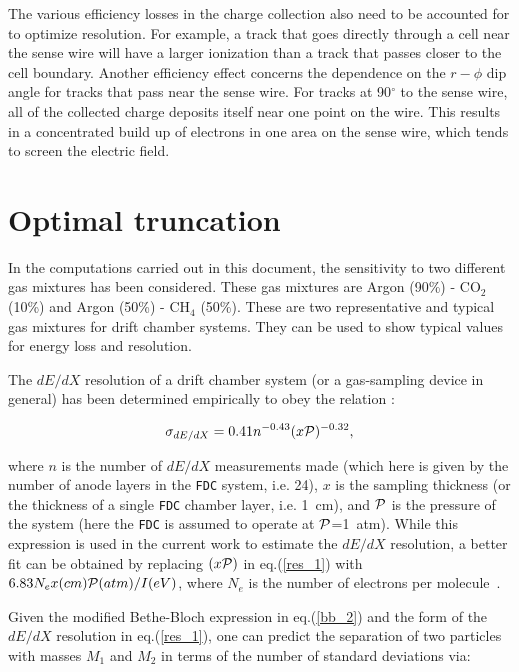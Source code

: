\documentclass[12pt]{article}
\begin{document}
The various efficiency losses in the charge collection also need to be
accounted for to optimize resolution.  For example, a track that goes
directly through a cell near the sense wire will have a larger ionization
than a track that passes closer to the cell boundary.
Another efficiency effect concerns the dependence on the $r - \phi$ dip
angle for tracks that pass near the sense wire.  For tracks at
90$^{\circ}$ to the sense wire, all of the collected charge deposits itself
near one point on the wire.  This results in a concentrated build up of
electrons in one area on the sense wire, which tends to screen the electric
field.

\section{Optimal truncation}
\label{sec:studies}

In the computations carried out in this document, the sensitivity to two different gas mixtures has been considered.  These gas mixtures are Argon (90\%) - CO$_2$ (10\%) 
and Argon (50\%) - CH$_4$ (50\%). These are two representative and typical gas mixtures for drift chamber systems.  They can be used to show typical values for energy loss and resolution.

The $dE/dX$ resolution of a drift chamber system (or a gas-sampling device in general) has been determined empirically to obey the relation \cite{yamamoto,walenta}:

\begin{equation}
\label{res_1}
\sigma_{dE/dX} = 0.41 n^{-0.43} (x {\cal{P}})^{-0.32},
\end{equation}

\noindent
where $n$ is the number of $dE/dX$ measurements made (which here is given by the number of anode layers in the {\tt FDC} system, i.e. 24), $x$ is the sampling thickness 
(or the thickness of a single {\tt FDC} chamber layer, i.e. 1~cm), and ${\cal{P}}$ is the pressure of the system (here the {\tt FDC} is assumed to operate at ${\cal{P}}$=1~atm). 
While this expression is used in the current work to estimate the $dE/dX$ resolution, a better fit can be obtained by replacing $(x{\cal{P}})$ in eq.(\ref{res_1}) with 
$6.83 N_e x(cm){\cal{P}}(atm)/I(eV)$, where $N_e$ is the number of electrons per molecule~\cite{allison}.

Given the modified Bethe-Bloch expression in eq.(\ref{bb_2}) and the form of the $dE/dX$ resolution in eq.(\ref{res_1}), one can predict the separation of two particles
 with masses $M_1$ and $M_2$ in terms of the number of standard deviations via:
\end{document}
